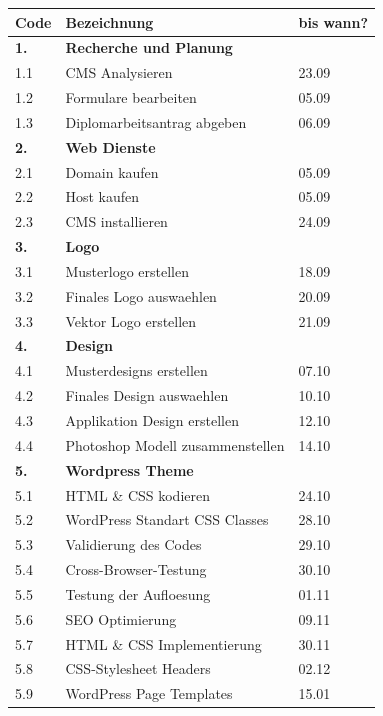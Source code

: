 \begin{table}[h]
\begin{center}
\begin{tabular}{ |l|l|l| } 
 \hline
 \textbf{Code} & \textbf{Bezeichnung} & \textbf{bis wann?}\\ 
 \hline
 \textbf{1.} & \textbf{Recherche und Planung} &  \\ 
 \hline
 1.1 & CMS Analysieren & 23.09 \\
 \hline
 1.2 & Formulare bearbeiten & 05.09 \\
 \hline
 1.3 & Diplomarbeitsantrag abgeben & 06.09 \\
 \hline
 \textbf{2.} & \textbf{Web Dienste} & \\
 \hline
 2.1 & Domain kaufen & 05.09 \\
\hline
2.2 & Host kaufen & 05.09 \\
\hline
2.3 & CMS installieren & 24.09 \\
\hline
\textbf{3.} & \textbf{Logo} & \\
\hline
3.1 & Musterlogo erstellen & 18.09 \\
 \hline
3.2 & Finales Logo auswaehlen & 20.09 \\
\hline
3.3 & Vektor Logo erstellen & 21.09 \\
\hline
 \textbf{4.} & \textbf{Design} & \\
 \hline
 4.1 & Musterdesigns erstellen & 07.10 \\
\hline
4.2 & Finales Design auswaehlen & 10.10 \\
\hline
4.3 & Applikation Design erstellen & 12.10 \\
\hline
4.4 & Photoshop Modell zusammenstellen & 14.10 \\
\hline
 \textbf{5.} & \textbf{Wordpress Theme} & \\
 \hline
 5.1 & HTML \& CSS kodieren & 24.10 \\
\hline
5.2 & WordPress Standart CSS Classes & 28.10 \\
\hline
5.3 & Validierung des Codes & 29.10 \\
\hline
5.4 & Cross-Browser-Testung & 30.10 \\
\hline
5.5 & Testung der Aufloesung & 01.11 \\
\hline
5.6 & SEO Optimierung & 09.11 \\
\hline
5.7 & HTML \& CSS Implementierung & 30.11 \\
\hline
5.8 & CSS-Stylesheet Headers & 02.12 \\
\hline
5.9 & WordPress Page Templates & 15.01 \\

\end{tabular}
\end{center}
\end{table}
